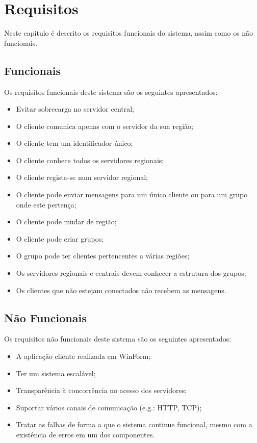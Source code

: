 \chapter{Requisitos}
Neste capitulo é descrito os requisitos funcionais do sistema, assim como os não funcionais.
\section{Funcionais}
Os requisitos funcionais deste sistema são os seguintes apresentados:
\begin{itemize}
	\item Evitar sobrecarga no servidor central;
	\item O cliente comunica apenas com o servidor da sua região;
	\item O cliente tem um identificador único;
	\item O cliente conhece todos os servidores regionais;
	\item O cliente regista-se num servidor regional;
	\item O cliente pode enviar mensagens para um único cliente ou para um grupo onde este pertença;
	\item O cliente pode mudar de região;
	\item O cliente pode criar grupos;
	\item O grupo pode ter clientes pertencentes a várias regiões;
	\item Os servidores regionais e centrais devem conhecer a estrutura dos grupos;
	\item Os clientes que não estejam conectados não recebem as mensagens.
\end{itemize}
\section{Não Funcionais}
Os requisitos não funcionais deste sistema são os seguintes apresentados:
\begin{itemize}
	\item A aplicação cliente realizada em WinForm;
	\item Ter um sistema escalável;
	\item Transparência à concorrência no acesso dos servidores;
	\item Suportar vários canais de comunicação (e.g.: HTTP, TCP);
	\item Tratar as falhas de forma a que o sistema continue funcional, mesmo com a existência de erros em um dos componentes.
\end{itemize}